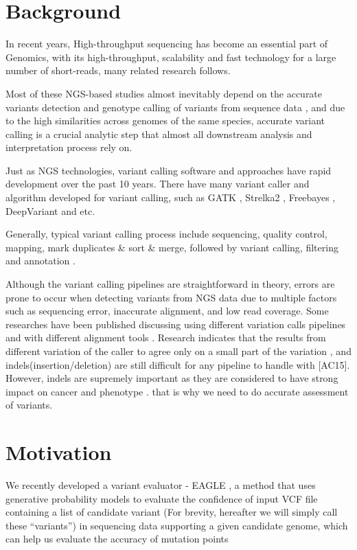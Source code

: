 \hspace{24pt}

\section{Background}
In recent years, High-throughput sequencing has become an essential part of Genomics, with its high-throughput, scalability and fast technology for a large number of short-reads, many related research follows.

Most of these NGS-based studies almost inevitably depend on the accurate variants detection and genotype calling of variants from sequence data \cite{nielsen2011genotype}, and due to the high similarities across genomes of the same species, accurate variant calling is a crucial analytic step that almost all downstream analysis and interpretation process rely on. 

Just as NGS technologies, variant calling software and approaches have rapid development over the past 10 years. There have many variant caller and algorithm developed for variant calling, such as GATK  \cite{poplin2018scaling}, Strelka2 \cite{saunders2012strelka}, Freebayes  \cite{garrison2012haplotype}, DeepVariant \cite{poplin2018universal} and etc.

Generally, typical variant calling process include sequencing, quality control, mapping, mark duplicates & sort & merge, followed by variant calling, filtering and annotation \cite{koboldt2020best}.

Although the variant calling pipelines are straightforward in theory, errors are prone to occur when detecting variants from NGS data due to multiple factors such as sequencing error, inaccurate alignment, and low read coverage. Some researches have been published discussing using different variation calls pipelines \cite{bian2018comparing} \cite{chen2019systematic} and with different alignment tools \cite{hwang2015systematic} \cite{zhao2020accuracy}. Research indicates that the results from different variation of the caller to agree only on a small part of the variation \cite{tian2015computational}, and indels(insertion/deletion) are still difficult for any pipeline to handle with [AC15]. However, indels are supremely important as they are considered to have strong impact on cancer\cite{sehn2015insertions} and phenotype \cite{montgomery2013origin}. that is why we need to do accurate assessment of variants.

\section{Motivation}	
We recently developed a variant evaluator - EAGLE \cite{kuo2018eagle}, a method that uses generative probability models to evaluate the confidence of input VCF file containing a list of candidate variant (For brevity, hereafter we will simply call these “variants”) in sequencing data supporting a given candidate genome, which can help us evaluate the accuracy of mutation points

